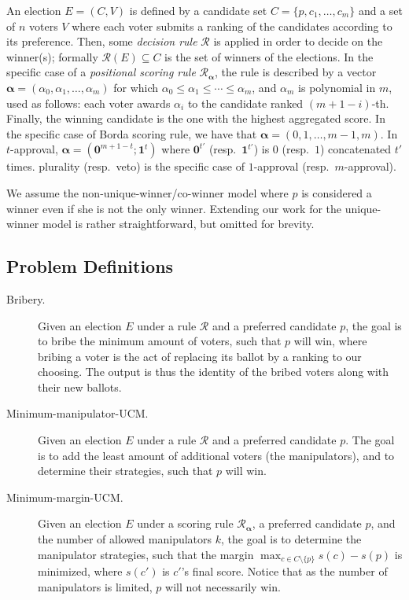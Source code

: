 \documentclass[letterpaper]{article} %
\theoremstyle{definition}
\newcommand\vecc{\mathbf}
\newcommand\vecgreek{\bm}
\newcommand{\veca}{\vecgreek{\alpha}}
\newcommand{\Ra}{\mathcal{R}_{\veca}}
\begin{document}
An election $E=(C,V)$ is defined by a candidate set $C=\{p,c_1,\ldots,c_m\}$ and a set of $n$ voters $V$ where each voter submits a ranking of the candidates according to its preference. Then, some \emph{decision rule} $\mathcal{R}$ is applied in order to decide on the winner(s); formally $\mathcal{R}(E) \subseteq C$ is the set of winners of the elections. In the specific case of a \emph{positional scoring rule} $\Ra$, the rule is described by a vector  $\veca = (\alpha_0,\alpha_1,\ldots,\alpha_m)$ for which $\alpha_0\leq \alpha_1 \leq \cdots \leq\alpha_m$, and $\alpha_m$ is polynomial in $m$, used as follows: each voter awards $\alpha_i$ to the candidate ranked $(m+1-i)$-th. Finally, the winning candidate is the one with the highest aggregated score. In the specific case of Borda scoring rule, we have that $\veca=(0,1,\ldots,m-1,m)$. In $t$-approval, $\veca=(\vecc{0}^{m+1-t};\vecc{1}^t)$ where $\vecc{0}^{t'}$ (resp.\ $\vecc{1}^{t'}$) is $0$ (resp.\ $1$) concatenated $t'$ times. plurality (resp.\ veto) is the specific case of $1$-approval (resp.\ $m$-approval).

We assume the non-unique-winner/co-winner model where $p$ is considered a winner even if she is not the only winner. Extending our work for the unique-winner model is rather straightforward, but omitted for brevity. 

\subsection{Problem Definitions}
\begin{description}
	\item[Bribery.] Given an election $E$ under a rule $\mathcal{R}$ and a preferred candidate $p$, the goal is to bribe the minimum amount of voters, such that $p$ will win, where bribing a voter is the act of replacing its ballot by a ranking to our choosing. The output is thus the identity of the bribed voters along with their new ballots.
	
	\item[Minimum-manipulator-UCM.] Given an election $E$ under a rule $\mathcal{R}$ and a preferred candidate $p$. The goal is to add the least amount of additional voters (the manipulators), and to determine their strategies, such that $p$ will win.
	
	\item[Minimum-margin-UCM.] Given an election $E$ under a scoring rule $\Ra$, a preferred candidate $p$, and the number of allowed manipulators $k$, the goal is to determine the manipulator strategies, such that the margin $\max_{c \in C \setminus \{p\}}s(c) - s(p)$ is minimized, where $s(c')$ is $c'$'s final score. Notice that as the number of manipulators is limited, $p$ will not necessarily win. 
\end{description}
	
\end{document}
